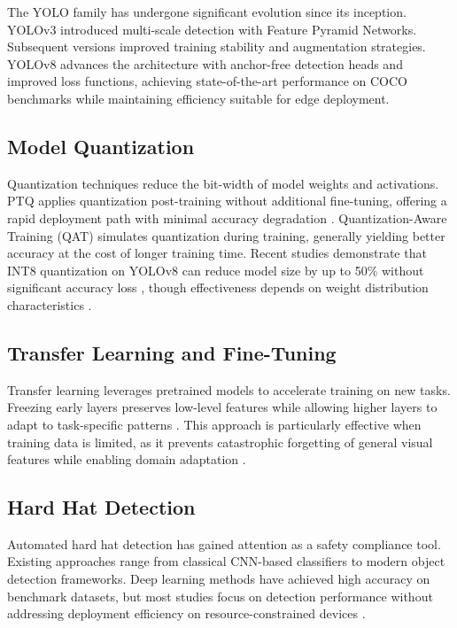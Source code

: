 \documentclass[conference,a4paper]{IEEEtran}
\begin{document}
The YOLO family has undergone significant evolution since its inception. YOLOv3 \cite{redmon2018yolov3} introduced multi-scale detection with Feature Pyramid Networks. Subsequent versions improved training stability and augmentation strategies. YOLOv8 \cite{jocher2023ultralytics} advances the architecture with anchor-free detection heads and improved loss functions, achieving state-of-the-art performance on COCO benchmarks while maintaining efficiency suitable for edge deployment.

\subsection{Model Quantization}

Quantization techniques reduce the bit-width of model weights and activations. PTQ applies quantization post-training without additional fine-tuning, offering a rapid deployment path with minimal accuracy degradation \cite{jacob2018quantization}. Quantization-Aware Training (QAT) simulates quantization during training, generally yielding better accuracy at the cost of longer training time. Recent studies demonstrate that INT8 quantization on YOLOv8 can reduce model size by up to 50\% without significant accuracy loss \cite{wicaksono2025optimizing}, though effectiveness depends on weight distribution characteristics \cite{rey2025performance}.

\subsection{Transfer Learning and Fine-Tuning}

Transfer learning leverages pretrained models to accelerate training on new tasks. Freezing early layers preserves low-level features while allowing higher layers to adapt to task-specific patterns \cite{tan2019efficientnet}. This approach is particularly effective when training data is limited, as it prevents catastrophic forgetting of general visual features while enabling domain adaptation \cite{howard2017mobilenets}.

\subsection{Hard Hat Detection}

Automated hard hat detection has gained attention as a safety compliance tool. Existing approaches range from classical CNN-based classifiers to modern object detection frameworks. Deep learning methods have achieved high accuracy on benchmark datasets, but most studies focus on detection performance without addressing deployment efficiency on resource-constrained devices \cite{li2020automatic, lin2022realtime}.
\end{document}
